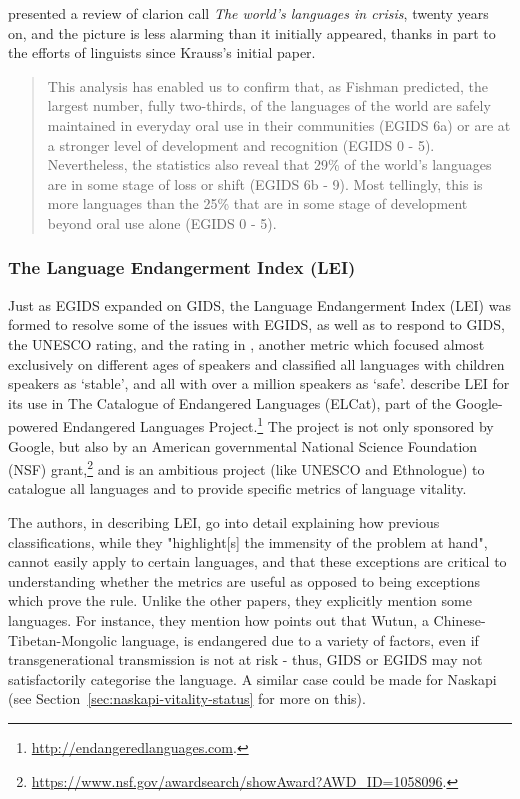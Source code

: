 \citet{simons2013world} presented a review of  clarion call \emph{The world's languages in crisis}, twenty years on, and the picture is less alarming than it initially appeared, thanks in part to the efforts of linguists since Krauss's initial paper.

\begin{quote}
This analysis has enabled us to confirm that, as Fishman predicted, the largest number, fully two-thirds, of the languages of the world are safely maintained in everyday oral use in their communities (EGIDS 6a) or are at a stronger level of development and recognition (EGIDS 0 - 5). Nevertheless, the statistics also reveal that 29\% of the world's languages are in some stage of loss or shift (EGIDS 6b - 9). Most tellingly, this is more languages than the 25\% that are in some stage of development beyond oral use alone (EGIDS 0 - 5). \citep[17]{simons2013world}
\end{quote}

\subsubsection{The Language Endangerment Index (LEI)}

Just as EGIDS expanded on GIDS, the Language Endangerment Index (LEI) was formed to resolve some of the issues with EGIDS, as well as to respond to GIDS, the UNESCO rating, and the rating in \citet{krauss2007classification}, another metric which focused almost exclusively on different ages of speakers and classified all languages with children speakers as `stable', and all with over a million speakers as `safe'. \citet{lee2016assessing} describe LEI for its use in The Catalogue of Endangered Languages (ELCat), part of the Google-powered Endangered Languages Project.\footnote{\href{http://endangeredlanguages.com}{http://endangeredlanguages.com}. } The project is not only sponsored by Google, but also by an American governmental National Science Foundation (NSF) grant,\footnote{\href{https://www.nsf.gov/awardsearch/showAward?AWD\_ID=1058096}{https://www.nsf.gov/awardsearch/showAward?AWD\_ID=1058096}. } and is an ambitious project (like UNESCO and Ethnologue) to catalogue all languages and to provide specific metrics of language vitality.

The authors, in describing LEI, go into detail explaining how previous classifications, while they "highlight[s] the immensity of the problem at hand", cannot easily apply to certain languages, and that these exceptions are critical to understanding whether the metrics are useful as opposed to being exceptions which prove the rule. Unlike the other papers, they explicitly mention some languages. For instance, they mention how \citet{dwyer2012tools} points out that Wutun, a Chinese-Tibetan-Mongolic language, is endangered due to a variety of factors, even if transgenerational transmission is not at risk - thus, GIDS or EGIDS may not satisfactorily categorise the language. A similar case could be made for Naskapi (see Section~\ref{sec:naskapi-vitality-status} for more on this).

